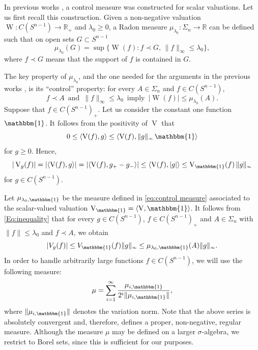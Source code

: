 \documentclass[11pt, a4paper]{amsart}
\newcommand{\uno}{\operatorname{\mathbbm{1}}}
\newcommand{\sn}{{S^{n-1}}}
\newcommand{\oV}{\operatorname{V}}
\newcommand{\oW}{\operatorname{W}}
\newcommand{\cfn}{C(\sn )_{\scriptscriptstyle +}}
\begin{document}
\goodbreak
In previous works \cite{TrViJMAA,TrViIntRep}, a control measure was constructed for scalar valuations. Let us first recall this construction. Given a non-negative %
valuation $\oW:C(\sn)\to\mathbb{R}_{\scriptscriptstyle +}$ and $\lambda_0\geq0$, a Radon measure $\mu_{\lambda_0}:\Sigma_n\to\mathbb{R}$ can be defined such that on open sets $G\subset \sn$ 
\begin{equation}\label{eq:control measure}
\mu_{\lambda_0}(G)=\sup\{\oW(f)\colon  f\prec G, \, \|f\|_{\scriptscriptstyle \infty}\leq \lambda_0\}, 
\end{equation}
where $f\prec G$ means that the support of $f$ is contained in $G$.  

The key property of $\mu_{\lambda_0}$, and the one needed for the arguments in the previous works \cite{TrViJMAA, TrViIntRep}, is its ``control'' property: for every $A\in\Sigma_n$ and $f\in C(\sn)$,
\begin{equation}\label{eq:control}
 f\prec A \,\text{ and }\,\|f\|_{\scriptscriptstyle \infty}\leq\lambda_0\,\text{ imply }\,|\oW(f)|\leq \mu_{\lambda_0}(A). 
\end{equation}
Suppose that $f\in \cfn$. Let us consider the constant one function $\uno$. It follows from the positivity of $\oV$ that
$$
0\leq \langle \oV(f),g\rangle\leq \langle \oV(f),\|g\|_{\scriptscriptstyle\infty}\uno\rangle
$$ 
for $g\ge0$.
Hence, 
\begin{equation}\label{Eq:inequality}
|\oV_g(f)|=|\langle \oV(f),g\rangle|=|\langle \oV(f),g_+-g_-\rangle|\leq \langle \oV(f),|g|\rangle\leq \oV_{\uno}(f)\,\|g\|_{\scriptscriptstyle \infty}
\end{equation}
for $g\in C(\sn )$.

Let $\mu_{\lambda_0,\uno }$ be the measure defined in \eqref{eq:control measure} associated to the scalar-valued valuation $\oV_{\uno}=\langle \oV, \uno\rangle$. It follows from \eqref{Eq:inequality} that for every $g\in C(\sn)$, $f\in\cfn$ and $A\in\Sigma_n$ with $\|f\|\leq \lambda_0$ and $f\prec A$, we obtain
\[
    |V_g(f)|\leq V_{\uno} (f)\|g\|_{\scriptscriptstyle \infty} \leq \mu_{\lambda_0,\uno} (A)\|g\|_{\scriptscriptstyle \infty}.
\]
In order to handle arbitrarily large functions $f\in C(\sn )$, we will use the following measure:
\begin{equation}\label{eq_deK_mu}
\mu=\sum_{i=1}^\infty\frac{\mu_{i,\uno}}{2^i\|\mu_{i,\uno}\|},    
\end{equation}
where $\|\mu_{i,\uno}\|$ denotes the variation norm. Note that the above series is absolutely convergent and, therefore, defines a proper, non-negative, regular measure. Although the measure $\mu$ may be defined on a larger $\sigma$-algebra, we restrict to Borel sets, since this is sufficient for our purposes. 
\end{document}
